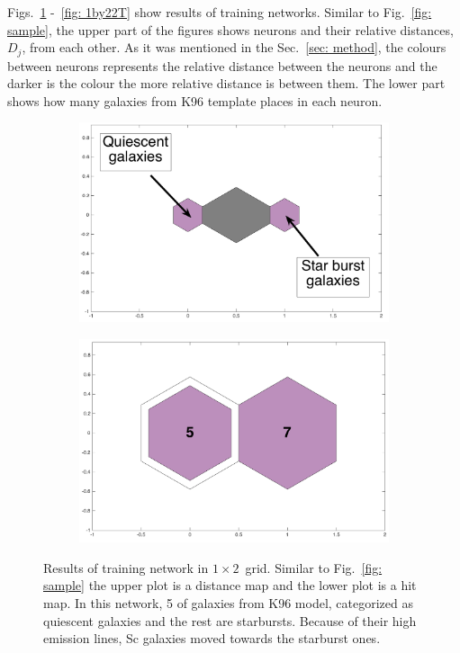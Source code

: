 \documentclass[useAMS,usenatbib]{mn2e}
\begin{document}
            Figs.~\ref{fig: 1by2T} -~\ref{fig: 1by22T} show results of training networks.
            Similar to Fig.~\ref{fig: sample}, the upper part of the figures shows neurons and their relative distances, $D_j$, from each other.
            As it was mentioned in the Sec.~\ref{sec: method}, the colours between neurons represents the relative distance between the neurons and the darker is the colour the more relative distance is between them.
            The lower part shows how many galaxies from K96 template places in each neuron. 
            \begin{figure}
                \begin{subfigure}[b]{0.5\textwidth}
                    \centering
                    \includegraphics[width=\textwidth]{images0.01/1d/dist_1_by_2.png}
                \end{subfigure}
                \hfill
                \begin{subfigure}[b]{0.5\textwidth}
                     \includegraphics[width=\textwidth]{images0.01/1d/hit_t_1_by_2.png}
                \end{subfigure}
                \caption{Results of training network in $1\times2$~grid. Similar to Fig.~\ref{fig: sample} the upper plot is a distance map and the lower plot is a hit map. In this network, 5 of galaxies from K96 model, categorized as quiescent galaxies and the rest are starbursts. Because of their high emission lines, Sc galaxies moved towards the starburst ones.}
                 \label{fig: 1by2T}
            \end{figure}
        
\end{document}
